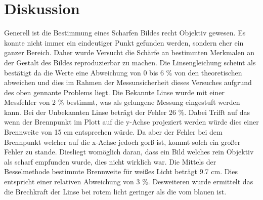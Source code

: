 \section{Diskussion}
\label{sec:Diskussion}
Generell ist die Bestimmung eines Scharfen Bildes recht Objektiv gewesen. Es konnte nicht immer ein eindeutiger Punkt gefunden werden, sondern eher ein ganzer Bereich. Daher wurde Versucht die Schärfe an bestimmten Merkmalen an der Gestalt des Bildes reproduzierbar zu machen. 
Die Linsengleichung scheint als bestätigt da die Werte eine Abweichung von 0 bis 6 \% von den theoretischen abweichen und dies im Rahmen der Messunsicherheit dieses Versuches aufgrund des oben gennante Problems liegt.
Die Bekannte Linse wurde mit einer Messfehler von 2 \% bestimmt, was als gelungene Messung eingestuft werden kann. 
Bei der Unbekannten Linse beträgt der Fehler 26 \%. Dabei Trifft auf das wenn der Brennpunkt im Plott auf die y-Achse projeziert werden würde dies einer Brennweite von 15 cm entsprechen würde. Da aber der Fehler bei dem Brennpunkt welcher auf  die x-Achse jedoch gorß ist, kommt solch ein großer Fehler zu stande. Diesliegt womöglich daran, dass ein Bild welches rein Objektiv als scharf empfunden wurde, dies nicht wirklich war.
Die Mittels der Besselmethode bestimmte Brennweite für weißes Licht beträgt 9.7 cm. Dies entspricht einer relativen Abweichung von 3 \%. Desweiteren wurde ermittelt das die Brechkraft der Linse bei rotem licht geringer als die vom blauen ist.

